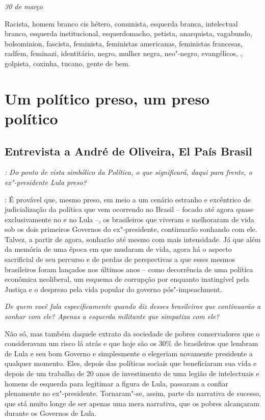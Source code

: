 \begin{flushright}
\emph{30 de março}
\end{flushright}

Racista, homem branco cis hétero, comunista, esquerda branca,
intelectual branco, esquerda institucional, esquerdomacho, petista,
anarquista, vagabundo, bolsominion, fascista, feminista, feministas
americanas, feministas francesas, radfem, feminazi, identitário, negro,
mulher negra, neo"-negro, evangélicos, , golpista, coxinha, tucano,
gente de bem.

\chapter{Um político preso, um preso político}

\section{Entrevista a André de Oliveira, El País Brasil}

\noindent\emph{: Do ponto de vista simbólico da Política, o que significará, daqui para
frente, o ex"-presidente Lula preso?}

\noindent{}: É provável que, mesmo preso, em meio a um cenário estranho e excêntrico
de judicialização da política que vem ocorrendo no Brasil -- focado até
agora quase exclusivamente no  e no Lula --, os brasileiros que
viveram e melhoraram de vida sob os dois primeiros Governos do
ex"-presidente, continuarão sonhando com ele. Talvez, a partir de agora,
sonharão até mesmo com mais intensidade. Já que além da memória de uma
época em que mudaram de vida, agora há o aspecto sacrificial de seu
percurso e de perdas de perspectivas a que esses mesmos brasileiros
foram lançados nos últimos anos -- como decorrência de uma política
econômica neoliberal, um esquema de corrupção por enquanto inatingível
pela Justiça e o desprezo pela vida popular do governo pós"-impeachment.

\medskip

\noindent\emph{De quem você fala especificamente quando diz desses brasileiros que
continuarão a sonhar com ele? Apenas a esquerda militante que simpatiza
com ele?}

\noindent Não só, mas também daquele extrato da sociedade de pobres conservadores
que o consideravam um risco lá atrás e que hoje são os 30\% de
brasileiros que lembram de Lula e seu bom Governo e simplesmente o
elegeriam novamente presidente a qualquer momento. Eles, depois das
políticas sociais que beneficiaram sua vida e depois de um trabalho de
20 anos de investimento de uma legião de intelectuais e homens de
esquerda para legitimar a figura de Lula, passaram a confiar plenamente
no ex"-presidente. Tornaram"-se, assim, parte da narrativa de sucesso, que
stá muito longe de ser apenas uma mera narrativa, que os pobres
alcançaram durante os Governos de Lula.

